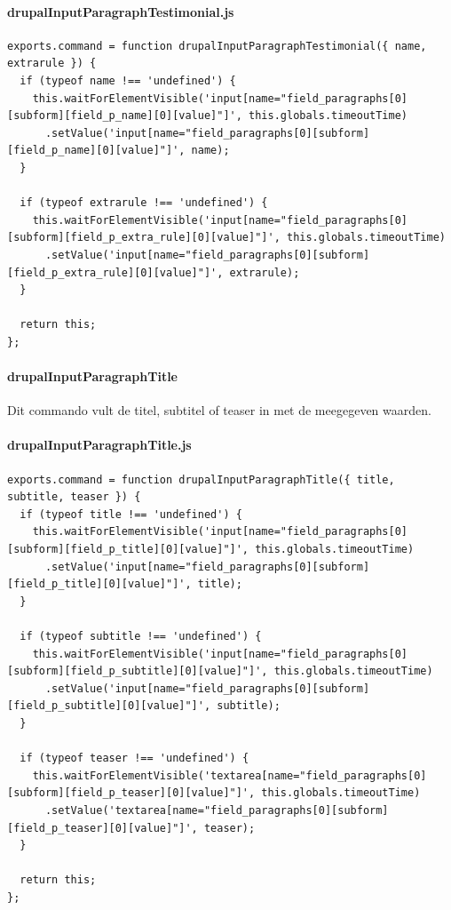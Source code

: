 \paragraph{drupalInputParagraphTestimonial.js}
\begin{lstlisting}[breaklines=true]
exports.command = function drupalInputParagraphTestimonial({ name, extrarule }) {
  if (typeof name !== 'undefined') {
    this.waitForElementVisible('input[name="field_paragraphs[0][subform][field_p_name][0][value]"]', this.globals.timeoutTime)
      .setValue('input[name="field_paragraphs[0][subform][field_p_name][0][value]"]', name);
  }

  if (typeof extrarule !== 'undefined') {
    this.waitForElementVisible('input[name="field_paragraphs[0][subform][field_p_extra_rule][0][value]"]', this.globals.timeoutTime)
      .setValue('input[name="field_paragraphs[0][subform][field_p_extra_rule][0][value]"]', extrarule);
  }

  return this;
};
\end{lstlisting}


\clearpage
\paragraph{drupalInputParagraphTitle}
\label{commando23}
Dit commando vult de titel, subtitel of teaser in met de meegegeven waarden.
\paragraph{drupalInputParagraphTitle.js}
\begin{lstlisting}[breaklines=true]
exports.command = function drupalInputParagraphTitle({ title, subtitle, teaser }) {
  if (typeof title !== 'undefined') {
    this.waitForElementVisible('input[name="field_paragraphs[0][subform][field_p_title][0][value]"]', this.globals.timeoutTime)
      .setValue('input[name="field_paragraphs[0][subform][field_p_title][0][value]"]', title);
  }

  if (typeof subtitle !== 'undefined') {
    this.waitForElementVisible('input[name="field_paragraphs[0][subform][field_p_subtitle][0][value]"]', this.globals.timeoutTime)
      .setValue('input[name="field_paragraphs[0][subform][field_p_subtitle][0][value]"]', subtitle);
  }

  if (typeof teaser !== 'undefined') {
    this.waitForElementVisible('textarea[name="field_paragraphs[0][subform][field_p_teaser][0][value]"]', this.globals.timeoutTime)
      .setValue('textarea[name="field_paragraphs[0][subform][field_p_teaser][0][value]"]', teaser);
  }
  
  return this;
};
\end{lstlisting}


